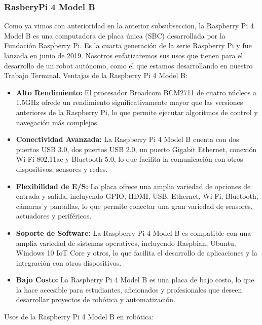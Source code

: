 \subsubsection{RasberyPi 4 Model B} %
\label{subsubsection:rasp4}
    Como ya vimos con anterioridad en la anterior subsubseccion, la Raspberry Pi 4 Model B es una computadora de placa \'unica 
        (SBC) desarrollada por la Fundaci\'on Raspberry Pi. Es la cuarta generaci\'on de la serie Raspberry Pi y fue lanzada en 
        junio de 2019. Nosotros enfatizaremos sus usos que tienen para el desarrollo de un robot aut\'onomo, como el que estamos
        desarrollando en nuestro Trabajo Terminal.
    \vskip 0.5cm
    Ventajas de la Raspberry Pi 4 Model B:
    \begin{itemize}
        \item \textbf{Alto Rendimiento:} El procesador Broadcom BCM2711 de cuatro n\'ucleos a 1.5GHz ofrede un rendimiento 
            significativamente mayor que las versiones anteriores de la Raspberry Pi, lo que permite ejecutar algoritmos 
            de control y navegaci\'on m\'as complejos.
        \item \textbf{Conectividad Avanzada:} La Raspberry Pi 4 Model B cuenta con dos puertos USB 3.0, dos puertos USB 2.0, 
            un puerto Gigabit Ethernet, conexi\'on Wi-Fi 802.11ac y Bluetooth 5.0, lo que facilita la comunicaci\'on con otros
            dispositivos, sensores y redes.
        \item \textbf{Flexibilidad de E/S:} La placa ofrece una amplia variedad de opciones de entrada y salida, incluyendo
            GPIO, HDMI, USB, Ethernet, Wi-Fi, Bluetooth, c\'amaras y pantallas, lo que permite conectar una gran variedad de
            sensores, actuadores y perif\'ericos.
        \item \textbf{Soporte de Software:} La Raspberry Pi 4 Model B es compatible con una amplia variedad de sistemas
            operativos, incluyendo Raspbian, Ubuntu, Windows 10 IoT Core y otros, lo que facilita el desarrollo de aplicaciones
            y la integraci\'on con otros dispositivos.
        \item \textbf{Bajo Costo:} La Raspberry Pi 4 Model B es una placa de bajo costo, lo que la hace accesible para
            estudiantes, aficionados y profesionales que deseen desarrollar proyectos de rob\'otica y automatizaci\'on.
    \end{itemize}
    \vskip 0.5cm
    Usos de la Raspberry Pi 4 Model B en rob\'otica:
